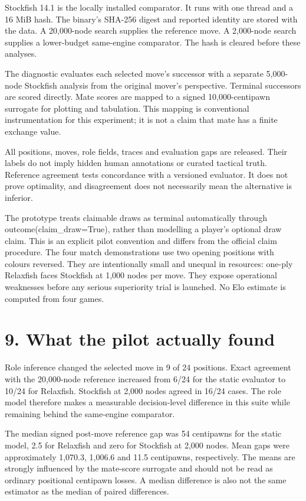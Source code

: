 \documentclass[10pt]{article}
\begin{document}
Stockfish 14.1 is the locally installed comparator. It runs with one thread and a 16 MiB hash. The binary's SHA-256 digest and reported identity are stored with the data. A 20,000-node search supplies the reference move. A 2,000-node search supplies a lower-budget same-engine comparator. The hash is cleared before these analyses.

The diagnostic evaluates each selected move's successor with a separate 5,000-node Stockfish analysis from the original mover's perspective. Terminal successors are scored directly. Mate scores are mapped to a signed 10,000-centipawn surrogate for plotting and tabulation. This mapping is conventional instrumentation for this experiment; it is not a claim that mate has a finite exchange value.

All positions, moves, role fields, traces and evaluation gaps are released. Their labels do not imply hidden human annotations or curated tactical truth. Reference agreement tests concordance with a versioned evaluator. It does not prove optimality, and disagreement does not necessarily mean the alternative is inferior.

The prototype treats claimable draws as terminal automatically through outcome(claim\_draw=True), rather than modelling a player's optional draw claim. This is an explicit pilot convention and differs from the official claim procedure. The four match demonstrations use two opening positions with colours reversed. They are intentionally small and unequal in resources: one-ply Relaxfish faces Stockfish at 1,000 nodes per move. They expose operational weaknesses before any serious superiority trial is launched. No Elo estimate is computed from four games.

\clearpage
\section*{9. What the pilot actually found}
Role inference changed the selected move in 9 of 24 positions. Exact agreement with the 20,000-node reference increased from 6/24 for the static evaluator to 10/24 for Relaxfish. Stockfish at 2,000 nodes agreed in 16/24 cases. The role model therefore makes a measurable decision-level difference in this suite while remaining behind the same-engine comparator.

The median signed post-move reference gap was 54 centipawns for the static model, 2.5 for Relaxfish and zero for Stockfish at 2,000 nodes. Mean gaps were approximately 1,070.3, 1,006.6 and 11.5 centipawns, respectively. The means are strongly influenced by the mate-score surrogate and should not be read as ordinary positional centipawn losses. A median difference is also not the same estimator as the median of paired differences.
\end{document}
